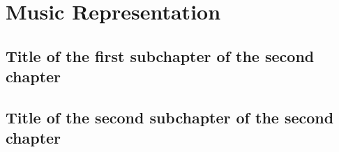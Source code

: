 \chapter{Music Representation}
\label{chap:MusicRepresentation}

\section{Title of the first subchapter of the second chapter}

\section{Title of the second subchapter of the second chapter}
